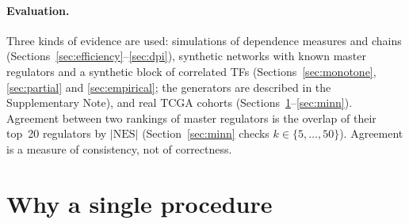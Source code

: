 \documentclass[11pt,a4paper]{article}
\theoremstyle{plain}
\theoremstyle{remark}
\begin{document}
\paragraph{Evaluation.} Three kinds of evidence are used: simulations of dependence measures and chains (Sections~\ref{sec:efficiency}--\ref{sec:dpi}),
synthetic networks with known master regulators and a synthetic block of correlated TFs (Sections~\ref{sec:monotone}, \ref{sec:partial} and \ref{sec:empirical}; the generators are
described in the Supplementary Note), and real TCGA cohorts (Sections~\ref{sec:oneprocedure}--\ref{sec:minn}). Agreement between two rankings of master regulators is the overlap of their
top~20 regulators by $|\mathrm{NES}|$ (Section~\ref{sec:minn} checks $k\in\{5,\dots,50\}$). Agreement is a measure of consistency, not of correctness.

\section{Why a single procedure}
\label{sec:oneprocedure}
\end{document}
